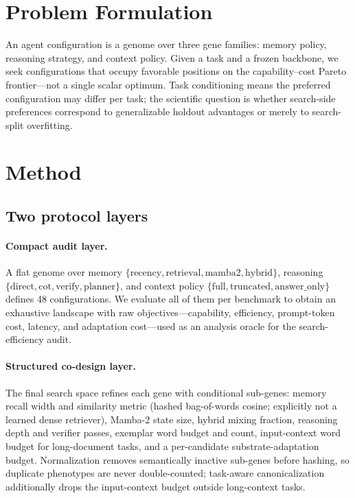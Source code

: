 \documentclass[11pt]{article}
\begin{document}
\section{Problem Formulation}

An agent configuration is a genome over three gene families: memory policy,
reasoning strategy, and context policy. Given a task and a frozen backbone,
we seek configurations that occupy favorable positions on the
capability--cost Pareto frontier---not a single scalar optimum. Task
conditioning means the preferred configuration may differ per task; the
scientific question is whether search-side preferences correspond to
generalizable holdout advantages or merely to search-split overfitting.

\section{Method}

\subsection{Two protocol layers}

\paragraph{Compact audit layer.} A flat genome over memory
$\{\text{recency}, \text{retrieval}, \text{mamba2}, \text{hybrid}\}$,
reasoning $\{\text{direct}, \text{cot}, \text{verify}, \text{planner}\}$,
and context policy $\{\text{full}, \text{truncated}, \text{answer\_only}\}$
defines 48 configurations. We evaluate all of them per benchmark to obtain
an exhaustive landscape with raw objectives---capability, efficiency,
prompt-token cost, latency, and adaptation cost---used as an analysis oracle
for the search-efficiency audit.

\paragraph{Structured co-design layer.} The final search space refines each
gene with conditional sub-genes: memory recall width and similarity metric
(hashed bag-of-words cosine; explicitly not a learned dense retriever),
Mamba-2 state size, hybrid mixing fraction, reasoning depth and verifier
passes, exemplar word budget and count, input-context word budget for
long-document tasks, and a per-candidate substrate-adaptation budget.
Normalization removes semantically inactive sub-genes before hashing, so
duplicate phenotypes are never double-counted; task-aware canonicalization
additionally drops the input-context budget outside long-context tasks.
\end{document}
